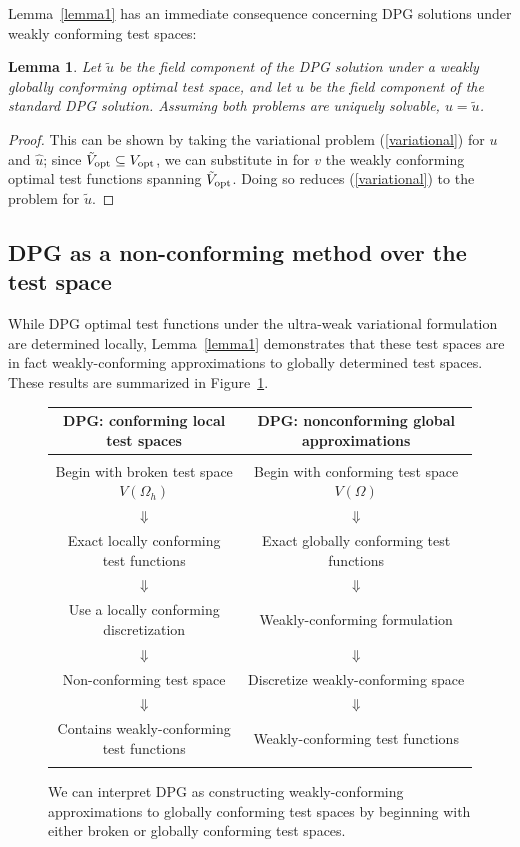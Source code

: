 \documentclass[11pt,onecolumn]{scrartcl}
\newcommand{\Oh}{\Omega_h}
\newtheorem{lemma}{Lemma}
\begin{document}
Lemma~\ref{lemma1} has an immediate consequence concerning DPG solutions under weakly conforming test spaces: 
\begin{lemma}
\label{lemma2}
Let $\tilde{u}$ be the field component of the DPG solution under a weakly globally conforming optimal test space, and let $u$ be the field component of the standard DPG solution.  Assuming both problems are uniquely solvable, $u = \tilde{u}$.  
\end{lemma}
\begin{proof}
This can be shown by taking the variational problem (\ref{variational}) for $u$ and $\widehat{u}$; since $\tilde{V}_{\rm opt} \subseteq V_{\rm opt}$, we can substitute in for $v$ the weakly conforming optimal test functions spanning $\tilde{V}_{\rm opt}$. Doing so reduces (\ref{variational}) to the problem for $\tilde{u}$.   
\end{proof}

\subsection{DPG as a non-conforming method over the test space}

While DPG optimal test functions under the ultra-weak variational formulation are determined locally, Lemma~\ref{lemma1} demonstrates that these test spaces are in fact weakly-conforming approximations to globally determined test spaces.  These results are summarized in Figure~\ref{fig:diagram}.  
\begin{figure}[!h]
\centering
\begin{tabular}{|| c | c ||}
\hline
\textbf{DPG: conforming local test spaces}  & 
\textbf{DPG: nonconforming global approximations}\\
\hline & \\
Begin with broken test space $V(\Oh)$ & Begin with conforming test space $V(\Omega)$\\
$\Downarrow$ & $\Downarrow$\\ 
Exact locally conforming test functions & Exact globally conforming test functions\\
$\Downarrow$ & $\Downarrow$\\ 
Use a locally conforming discretization & Weakly-conforming formulation \\
$\Downarrow$ & $\Downarrow$  \\ 
Non-conforming test space &  Discretize weakly-conforming space\\
$\Downarrow$ & $\Downarrow$  \\ 
Contains weakly-conforming test functions & Weakly-conforming test functions \\
& \\ \hline
\end{tabular}
\caption{We can interpret DPG as constructing weakly-conforming approximations to globally conforming test spaces by beginning with either broken or globally conforming test spaces. }
\label{fig:diagram}
\end{figure}
\end{document}
